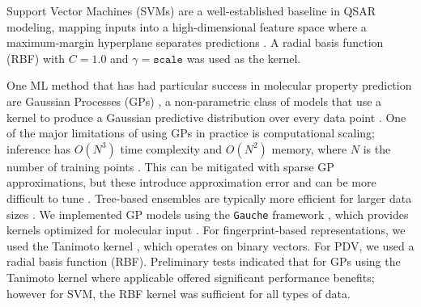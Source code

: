\documentclass[pdflatex,sn-basic]{sn-jnl}%
\theoremstyle{thmstyleone}%
\theoremstyle{thmstyletwo}%
\theoremstyle{thmstylethree}%
\begin{document}
Support Vector Machines (SVMs) are a well-established baseline in QSAR modeling, mapping inputs into a high-dimensional feature space where a maximum-margin hyperplane separates predictions \citep{Vapnik1995, Svetnik2003}. A radial basis function (RBF) with $C = 1.0$ and $\gamma = \texttt{scale}$ was used as the kernel. 

One ML method that has had particular success in molecular property prediction are Gaussian Processes (GPs) \citep{Obrezanova2007, gauche}, a non-parametric class of models that use a kernel to produce a Gaussian predictive distribution over every data point \citep{Obrezanova2007}. One of the major limitations of using GPs in practice is computational scaling; inference has $O(N^3)$ time complexity and $O(N^2)$ memory, where $N$ is the number of training points \citep{Rasmussen2005}. This can be mitigated with sparse GP approximations, but these introduce approximation error and can be more difficult to tune \citep{quinonero2005}. Tree-based ensembles are typically more efficient for larger data sizes \citep{lakshminarayanan2017}. We implemented GP models using the \texttt{Gauche} framework \citep{gauche}, which provides kernels optimized for molecular input \citep{gauche}. For fingerprint-based representations, we used the Tanimoto kernel \citep{Ralaivola2005, moss2020, gauche}, which operates on binary vectors. For PDV, we used a radial basis function (RBF). Preliminary tests indicated that for GPs using the Tanimoto kernel where applicable offered significant performance benefits; however for SVM, the RBF kernel was sufficient for all types of data. 
\end{document}
